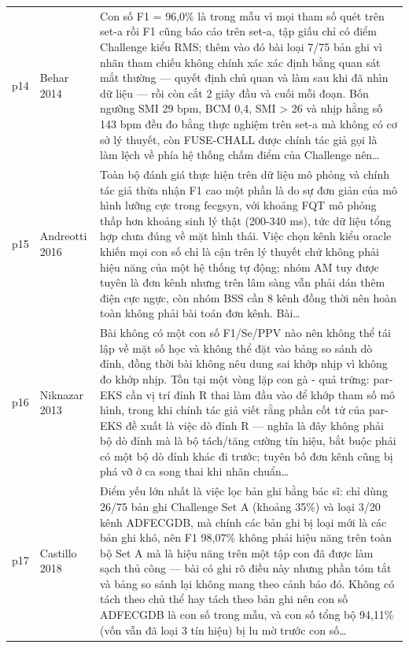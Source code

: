 \begin{longtable}{@{}L{1.05cm} L{3.2cm} L{10.1cm}@{}}
p14 & {\scriptsize Behar 2014} & {\scriptsize Con số F1 = 96,0\% là trong mẫu vì mọi tham số quét trên set-a rồi F1 cũng báo cáo trên set-a, tập giấu chỉ có điểm Challenge kiểu RMS; thêm vào đó bài loại 7/75 bản ghi vì nhãn tham chiếu không chính xác xác định bằng quan sát mắt thường — quyết định chủ quan và làm sau khi đã nhìn dữ liệu — rồi còn cắt 2 giây đầu và cuối mỗi đoạn. Bốn ngưỡng SMI 29 bpm, BCM 0,4, SMI > 26 và nhịp hằng số 143 bpm đều đo bằng thực nghiệm trên set-a mà không có cơ sở lý thuyết, còn FUSE-CHALL được chính tác giả gọi là làm lệch về phía hệ thống chấm điểm của Challenge nên…} \\[2pt]
p15 & {\scriptsize Andreotti 2016} & {\scriptsize Toàn bộ đánh giá thực hiện trên dữ liệu mô phỏng và chính tác giả thừa nhận F1 cao một phần là do sự đơn giản của mô hình lưỡng cực trong fecgsyn, với khoảng FQT mô phỏng thấp hơn khoảng sinh lý thật (200-340 ms), tức dữ liệu tổng hợp chưa đúng về mặt hình thái. Việc chọn kênh kiểu oracle khiến mọi con số chỉ là cận trên lý thuyết chứ không phải hiệu năng của một hệ thống tự động; nhóm AM tuy được tuyên là đơn kênh nhưng trên lâm sàng vẫn phải dán thêm điện cực ngực, còn nhóm BSS cần 8 kênh đồng thời nên hoàn toàn không phải bài toán đơn kênh. Bài…} \\[2pt]
p16 & {\scriptsize Niknazar 2013} & {\scriptsize Bài không có một con số F1/Se/PPV nào nên không thể tái lập về mặt số học và không thể đặt vào bảng so sánh dò đỉnh, đồng thời bài không nêu dung sai khớp nhịp vì không đo khớp nhịp. Tồn tại một vòng lặp con gà - quả trứng: par-EKS cần vị trí đỉnh R thai làm đầu vào để khớp tham số mô hình, trong khi chính tác giả viết rằng phần cốt tử của par-EKS đề xuất là việc dò đỉnh R — nghĩa là đây không phải bộ dò đỉnh mà là bộ tách/tăng cường tín hiệu, bắt buộc phải có một bộ dò đỉnh khác đi trước; tuyên bố đơn kênh cũng bị phá vỡ ở ca song thai khi nhãn chuẩn…} \\[2pt]
p17 & {\scriptsize Castillo 2018} & {\scriptsize Điểm yếu lớn nhất là việc lọc bản ghi bằng bác sĩ: chỉ dùng 26/75 bản ghi Challenge Set A (khoảng 35\%) và loại 3/20 kênh ADFECGDB, mà chính các bản ghi bị loại mới là các bản ghi khó, nên F1 98,07\% không phải hiệu năng trên toàn bộ Set A mà là hiệu năng trên một tập con đã được làm sạch thủ công — bài có ghi rõ điều này nhưng phần tóm tắt và bảng so sánh lại không mang theo cảnh báo đó. Không có tách theo chủ thể hay tách theo bản ghi nên con số ADFECGDB là con số trong mẫu, và con số tổng bộ 94,11\% (vốn vẫn đã loại 3 tín hiệu) bị lu mờ trước con số…} \\[2pt]

\end{longtable}
